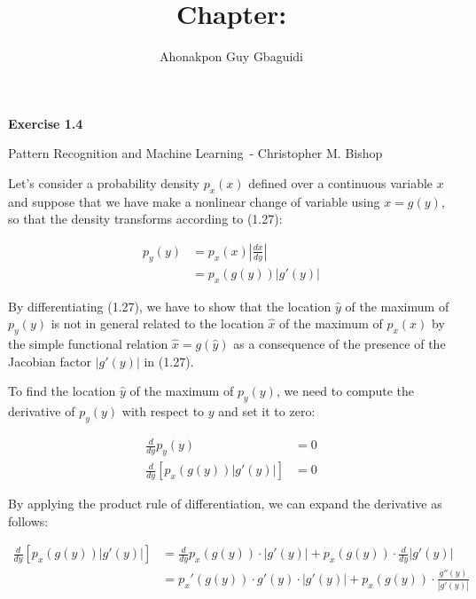 \documentclass{article}
\title{Chapter: \ChapterName}
\author{Ahonakpon Guy Gbaguidi}
\date{}
\newcommand{\BookName}{Pattern Recognition and Machine Learning}
\newcommand{\BookAuthor}{Christopher M. Bishop}
\newcommand{\ExerciseID}{1.4}
\begin{document}
\maketitle

\begin{center}
  \large\textbf{Exercise \ExerciseID}

  \vspace{0.5em}

  \normalsize\BookName\ - \BookAuthor
\end{center}

\begin{tcolorbox}[breakable,colback=gray!5,colframe=gray!60,title=Solution]
Let's consider a probability density $p_x(x)$ defined over a continuous variable 
$x$ and suppose that we have make a nonlinear change of variable using $x = g(y)$, 
so that the density transforms according  to (1.27):

\begin{align*}
  p_y(y) &= p_x(x) \left| \frac{dx}{dy} \right| \\
  &= p_x(g(y)) \left| g'(y) \right|
\end{align*}

By differentiating (1.27), we have to show that the location $\hat{y}$ of the maximum
of $p_y(y)$ is not in general related to the location $\hat{x}$ of the maximum of $p_x(x)$ 
by the simple functional relation $\hat{x} = g(\hat{y})$ as a consequence of the presence 
of the Jacobian factor $\left| g'(y) \right|$ in (1.27).
\par\medskip

To find the location $\hat{y}$ of the maximum of $p_y(y)$, we need to compute the derivative 
of $p_y(y)$ with respect to $y$ and set it to zero:

\begin{align*}
  \frac{d}{dy} p_y(y) &= 0 \\
  \frac{d}{dy} \left[ p_x(g(y)) \left| g'(y) \right| \right] &= 0
\end{align*}

By applying the product rule of differentiation, we can expand the derivative as follows:

\begin{align*}
  \frac{d}{dy} \left[ p_x(g(y)) \left| g'(y) \right| \right] &= \frac{d}{dy} p_x(g(y)) \cdot \left| g'(y) \right| + p_x(g(y)) \cdot \frac{d}{dy} \left| g'(y) \right| \\
  &= p_x'(g(y)) \cdot g'(y) \cdot \left| g'(y) \right| + p_x(g(y)) \cdot \frac{g''(y)}{\left| g'(y) \right|}
\end{align*}


\end{tcolorbox}
\end{document}
